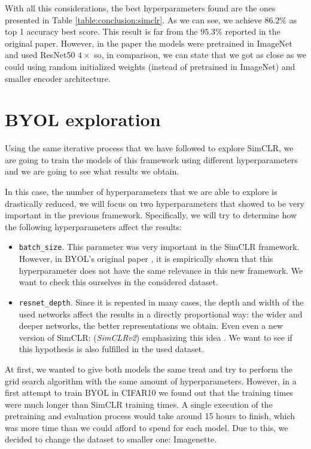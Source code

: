 With all this considerations, the best hyperparameters found are the ones presented in Table \ref{table:conclusion:simclr}. As we can see, we achieve $86.2\%$ as top 1 accuracy best score. This result is far from the $95.3\%$ reported in the original paper. However, in the paper the models were pretrained in ImageNet and used ResNet50 $4\times$ so, in comparison, we can state that we got as close as we could using random initialized weights (instead of pretrained in ImageNet) and smaller encoder architecture.

\section{BYOL exploration}

Using the same iterative process that we have followed to explore SimCLR, we are going to train the models of this framework using different hyperparameters and we are going to see what results we obtain.

In this case, the number of hyperparameters that we are able to explore is drastically reduced, we will focus on two hyperparameters that showed to be very important in the previous framework. Specifically, we will try to determine how the following hyperparameters affect the results:

\begin{itemize}
\item \lstinline{batch_size}. This parameter was very important in the SimCLR framework. However, in BYOL's original paper \citep{grill2020bootstrap}, it is empirically shown that this hyperparameter does not have the same relevance in this new framework. We want to check this ourselves in the considered dataset.
\item \lstinline{resnet_depth}. Since it is repeated in many cases, the depth and width of the used networks affect the results in a directly proportional way: the wider and deeper networks, the better representations we obtain. Even even a new version of SimCLR: (\emph{SimCLRv2}) emphasizing this idea \citep{chen2020big}. We want to see if this hypothesis is also fulfilled in the used dataset.
\end{itemize}

At first, we wanted to give both models the same treat and try to perform the grid search algorithm with the same amount of hyperparameters. However, in a first attempt to train BYOL in CIFAR10 we found out that the training times were much longer than SimCLR training times. A single execution of the pretraining and evaluation process would take around 15 hours to finish, which was more time than we could afford to spend for each model. Due to this, we decided to change the dataset to smaller one: Imagenette. 


